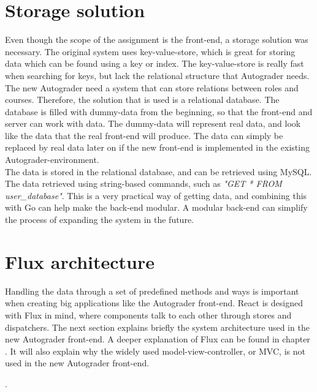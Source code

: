\section{Storage solution}
Even though the scope of the assignment is the front-end, a storage solution was necessary. The original system uses key-value-store, which is great for storing data which can be found using a key or index. The key-value-store is really fast when searching for keys, but lack the relational structure that Autograder needs. The new Autograder need a system that can store relations between roles and courses. Therefore, the solution that is used is a relational database. The database is filled with dummy-data from the beginning, so that the front-end and server can work with data. The dummy-data will represent real data, and look like the data that the real front-end will produce. The data can simply be replaced by real data later on if the new front-end is implemented in the existing Autograder-environment. \\The data is stored in the relational database, and can be retrieved using MySQL. The data retrieved using string-based commands, such as \emph{"GET * FROM user\_database"}. This is a very practical way of getting data, and combining this with Go can help make the back-end modular. A modular back-end can simplify the process of expanding the system in the future.

\section{Flux architecture}


Handling the data through a set of predefined methods and ways is important when creating big applications like the Autograder front-end. React is designed with Flux in mind, where components talk to each other through stores and dispatchers. The next section explains briefly the system architecture used in the new Autograder front-end. A deeper explanation of Flux can be found in chapter . It will also explain why the widely used model-view-controller, or MVC, is not used in the new Autograder front-end.

  
 .

